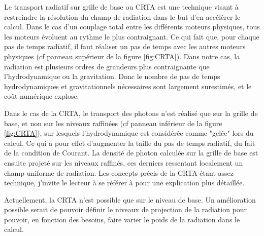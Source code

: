 Le transport radiatif sur grille de base ou \ac{CRTA} est une technique visant à restreindre la résolution du champ de radiation dans le but d'en accélérer le calcul.
Dans le cas d'un couplage total entre les différents moteurs physiques, tous les moteurs évoluent au rythme le plus contraignant.
Ce qui fait que, pour chaque pas de temps radiatif, il faut réaliser un pas de temps avec les autres moteurs physiques (cf panneau supérieur de la figure \ref{fig:CRTA}).
Dans notre cas, la radiation est plusieurs ordres de grandeurs plus contraignante que l'hydrodynamique ou la gravitation.
Donc le nombre de pas de temps hydrodynamiques et gravitationnels nécessaires sont largement surestimés, et le coût numérique explose.

Dans le cas de la \ac{CRTA}, le transport des photons n'est réalisé que sur la grille de base, et non sur les niveaux raffinées (cf panneau inférieur de la figure \ref{fig:CRTA}), sur lesquels l'hydrodynamique est considérée comme "gelée" lors du calcul.
Ce qui a pour effet d'augmenter la taille du pas de temps radiatif, du fait de la condition de Courant.
La densité de photon calculée sur la grille de base est ensuite projeté sur les niveaux raffinés, ces derniers ressentant localement un champ uniforme de radiation.
Les concepts précis de la \ac{CRTA} étant assez technique, j'invite le lecteur à se référer à \cite{aubert_emma:_2015} pour une explication plus détaillée.

Actuellement, la \ac{CRTA} n'est possible que sur le niveau de base.
Un amélioration possible serait de pouvoir définir le niveaux de projection de la radiation pour pouvoir, en fonction des besoins, faire varier le poids de la radiation dans le calcul.


